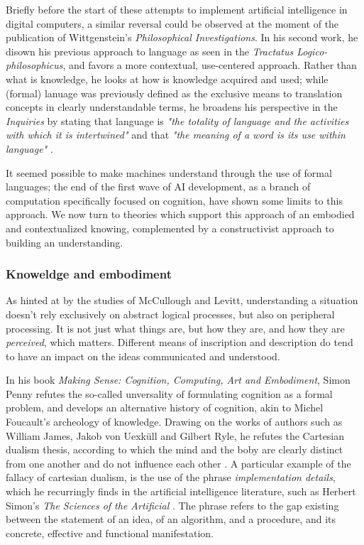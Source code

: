 Briefly before the start of these attempts to implement artificial intelligence in digital computers, a similar reversal could be observed at the moment of the publication of Wittgenstein's \emph{Philosophical Investigations}. In his second work, he disown his previous approach to language as seen in the \emph{Tractatus Logico-philosophicus}, and favors a more contextual, use-centered approach. Rather than what is knowledge, he looks at how is knowledge acquired and used; while (formal) lanuage was previously defined as the exclusive means to translation concepts in clearly understandable terms, he broadens his perspective in the \emph{Inquiries} by stating that language is \emph{"the totality of language and the activities with which it is intertwined"} and that \emph{"the meaning of a word is its use within language"} \citep{wittgenstein_recherches_2004}.

It seemed possible to make machines understand through the use of formal languages; the end of the first wave of AI development, as a branch of computation specifically focused on cognition, have shown some limits to this approach.  We now turn to theories which support this approach of an embodied and contextualized knowing, complemented by a constructivist approach to building an understanding.

\subsubsection{Knoweldge and embodiment}

As hinted at by the studies of McCullough and Levitt, understanding a situation doesn't rely exclusively on abstract logical processes, but also on peripheral processing. It is not just what things are, but how they are, and how they are \emph{perceived}, which matters. Different means of inscription and description do tend to have an impact on the ideas communicated and understood.

In his book \emph{Making Sense: Cognition, Computing, Art and Embodiment}, Simon Penny refutes the so-called unversality of formulating cognition as a formal problem, and develops an alternative history of cognition, akin to Michel Foucault's archeology of knowledge. Drawing on the works of authors such as William James, Jakob von Uexküll and Gilbert Ryle, he refutes the Cartesian dualism thesis, according to which the mind and the boby are clearly distinct from one another and do not influence each other \citep{penny_making_2019}. A particular example of the fallacy of cartesian dualism, is the use of the phrase \emph{implementation details}, which he recurringly finds in the artificial intelligence literature, such as Herbert Simon's \emph{The Sciences of the Artificial} \citep{simon_sciences_1996}. The phrase refers to the gap existing between the statement of an idea, of an algorithm, and a procedure, and its concrete, effective and functional manifestation.

